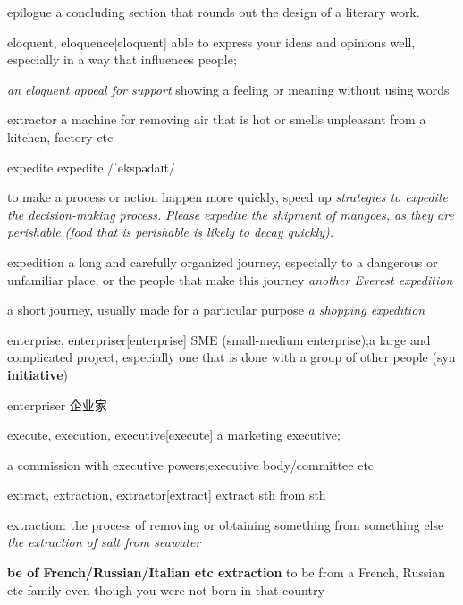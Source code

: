\begin{word}{epilogue}
    a concluding section that rounds out the design of a literary work.
\end{word}

\begin{word}{eloquent, eloquence}[eloquent]
    able to express your ideas and opinions well, especially in a way that influences people;

\textit{an eloquent appeal for support}
showing a feeling or meaning without using words
\end{word}

\begin{word}{extractor}
    a machine for removing air that is hot or smells unpleasant from a kitchen, factory etc
\end{word}

\begin{word}{expedite}
    expedite /ˈekspədaɪt/

    to make a process or action happen more quickly, speed up
    \textit{strategies to expedite the decision-making process.}
    \textit{Please expedite the shipment of mangoes, as they are perishable (food that is perishable is likely to decay quickly).}
\end{word}

\begin{word}{expedition}
    a long and carefully organized journey, especially to a dangerous or unfamiliar place, or the people that make this journey
    \textit{another Everest expedition}

    a short journey, usually made for a particular purpose
    \textit{a shopping expedition}
\end{word}

\begin{word}{enterprise, enterpriser}[enterprise]
    SME (small-medium enterprise);a large and complicated project, especially one that is done with a group of other people (syn \textbf{initiative})

    enterpriser 企业家
\end{word}

\begin{word}{execute, execution, executive}[execute]
    a marketing executive; 
    
    a commission with executive powers;executive body/committee etc
\end{word}

\begin{word}{extract, extraction, extractor}[extract]
    extract sth from sth

    extraction: the process of removing or obtaining something from something else
    \textit{the extraction of salt from seawater}

    \textbf{be of French/Russian/Italian etc extraction} to be from a French, Russian etc family even though you were not born in that country
\end{word}

